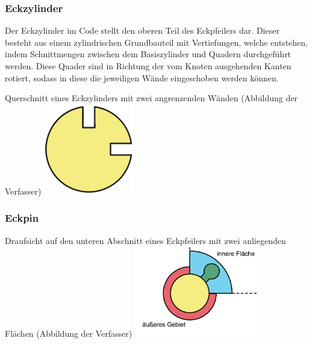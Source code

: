 \subsubsection{Eckzylinder}
Der Eckzylinder im Code  stellt den oberen Teil des Eckpfeilers dar.
Dieser besteht aus einem zylindrischen Grundbauteil mit Vertiefungen, welche entstehen, indem Schnittmengen zwischen dem Basiszylinder und Quadern durchgeführt werden.
Diese Quader sind in Richtung der vom Knoten ausgehenden Kanten rotiert, sodass in diese die jeweiligen Wände eingeschoben werden können.

\begin{Bild}{Querschnitt eines Eckzylinders mit zwei angrenzenden Wänden (Abbildung der Verfasser)}
	\includegraphics[height=150px]{Bilder/CornerCylinder2D-06.png}
\end{Bild}

\subsubsection{Eckpin}
\label{Eckpin}

\begin{Bild}{Draufsicht auf den unteren Abschnitt eines Eckpfeilers mit zwei anliegenden Flächen (Abbildung der Verfasser)}
	\includegraphics[height=150px]{Bilder/CornerPin2D-07.png}
\end{Bild}

